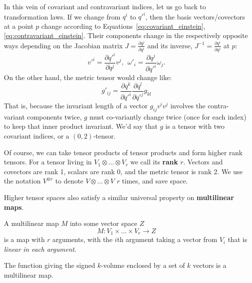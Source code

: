 	In this vein of covariant and contravariant indices, let us go back to transformation laws. If we change from $q^i$ to $q'^i$, then the basis vectors/covectors at a point $p$ change according to Equations~\eqref{eq:covariant_einstein},\eqref{eq:contravariant_einstein}. Their components change in the respectively opposite ways depending on the Jacobian matrix $J = \frac{\partial q^j}{\partial q^i}$ and its inverse, $J^{-1} = \frac{\partial q^i}{\partial q^j}$ at $p$:
	\begin{equation}
		v'^i = \frac{\partial q'^i}{\partial q^j} v^j, ~~ \omega'_i = \frac{\partial q^j}{\partial q'^i} \omega_j.
	\end{equation}
	On the other hand, the metric tensor would change like:
	\begin{equation}
		g'_{ij} = \frac{\partial q^k}{\partial q'^i} \frac{\partial q^l}{\partial q'^j} g_{kl}
	\end{equation}
	That is, because the invariant length of a vector $g_{ij} v^i v^j$ involves the contra-variant components twice, $g$ must co-variantly change twice (once for each index) to keep that inner product invariant. We'd say that $g$ is a tensor with two covariant indices, or a $(0,2)$-tensor. 
	
	Of course, we can take tensor products of tensor products and form higher rank tensors. For a tensor living in $V_1 \otimes \dots \otimes V_r$ we call its \textbf{rank} $r$. Vectors and covectors are rank 1, scalars are rank 0, and the metric tensor is rank 2. We use the notation $V^{\otimes r}$ to denote $V \otimes \dots \otimes V$ $r$ times, and save space.
	
	Higher tensor spaces also satisfy a similar universal property on \textbf{multilinear maps}.
	\begin{defn}
		A multilinear map $M$ into some vector space $Z$
		\begin{equation}
			M: V_1 \times \dots \times V_r \rightarrow Z 
		\end{equation}
		is a map with $r$ arguments, with the $i$th argument taking a vector from $V_i$ that is \emph{linear in each argument}. 
	\end{defn}
	
	
	\begin{example}
		The function giving the signed $k$-volume enclosed by a set of $k$ vectors is a multilinear map. 
	\end{example}
	

